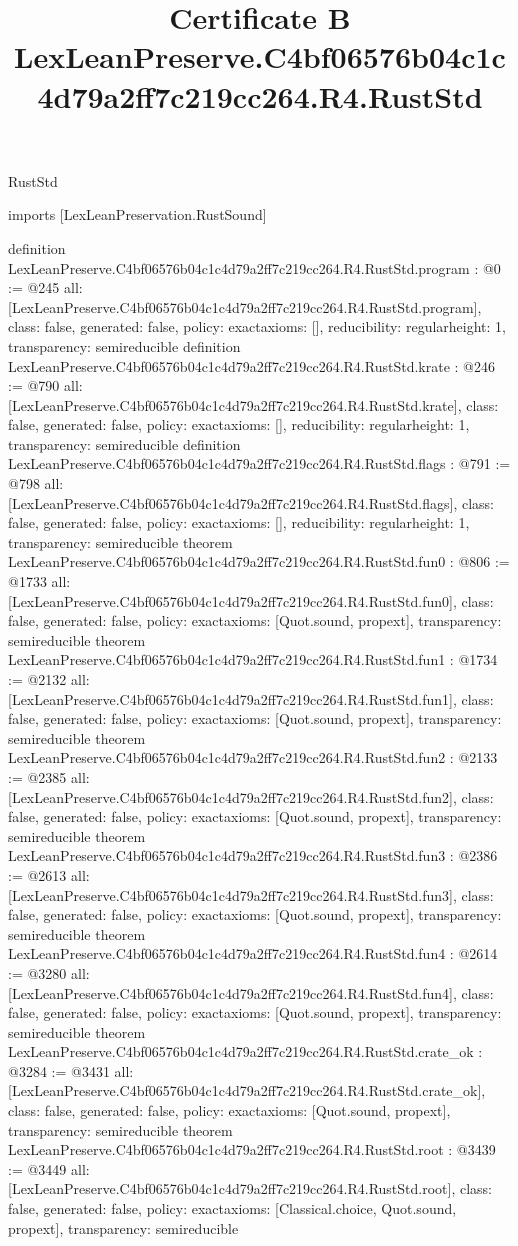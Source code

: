 \begin{lexlean}{RustStd}
\title{Certificate B LexLeanPreserve.C4bf06576b04c1c4d79a2ff7c219cc264.R4.RustStd}
\begin{coremodule}
imports [LexLeanPreservation.RustSound]

definition LexLeanPreserve.C4bf06576b04c1c4d79a2ff7c219cc264.R4.RustStd.program : @0 := @245 {
  all: [LexLeanPreserve.C4bf06576b04c1c4d79a2ff7c219cc264.R4.RustStd.program],
  class: false,
  generated: false,
  policy: exact{axioms: []},
  reducibility: regular{height: 1},
  transparency: semireducible
}
definition LexLeanPreserve.C4bf06576b04c1c4d79a2ff7c219cc264.R4.RustStd.krate : @246 := @790 {
  all: [LexLeanPreserve.C4bf06576b04c1c4d79a2ff7c219cc264.R4.RustStd.krate],
  class: false,
  generated: false,
  policy: exact{axioms: []},
  reducibility: regular{height: 1},
  transparency: semireducible
}
definition LexLeanPreserve.C4bf06576b04c1c4d79a2ff7c219cc264.R4.RustStd.flags : @791 := @798 {
  all: [LexLeanPreserve.C4bf06576b04c1c4d79a2ff7c219cc264.R4.RustStd.flags],
  class: false,
  generated: false,
  policy: exact{axioms: []},
  reducibility: regular{height: 1},
  transparency: semireducible
}
theorem LexLeanPreserve.C4bf06576b04c1c4d79a2ff7c219cc264.R4.RustStd.fun0 : @806 := @1733 {
  all: [LexLeanPreserve.C4bf06576b04c1c4d79a2ff7c219cc264.R4.RustStd.fun0],
  class: false,
  generated: false,
  policy: exact{axioms: [Quot.sound, propext]},
  transparency: semireducible
}
theorem LexLeanPreserve.C4bf06576b04c1c4d79a2ff7c219cc264.R4.RustStd.fun1 : @1734 := @2132 {
  all: [LexLeanPreserve.C4bf06576b04c1c4d79a2ff7c219cc264.R4.RustStd.fun1],
  class: false,
  generated: false,
  policy: exact{axioms: [Quot.sound, propext]},
  transparency: semireducible
}
theorem LexLeanPreserve.C4bf06576b04c1c4d79a2ff7c219cc264.R4.RustStd.fun2 : @2133 := @2385 {
  all: [LexLeanPreserve.C4bf06576b04c1c4d79a2ff7c219cc264.R4.RustStd.fun2],
  class: false,
  generated: false,
  policy: exact{axioms: [Quot.sound, propext]},
  transparency: semireducible
}
theorem LexLeanPreserve.C4bf06576b04c1c4d79a2ff7c219cc264.R4.RustStd.fun3 : @2386 := @2613 {
  all: [LexLeanPreserve.C4bf06576b04c1c4d79a2ff7c219cc264.R4.RustStd.fun3],
  class: false,
  generated: false,
  policy: exact{axioms: [Quot.sound, propext]},
  transparency: semireducible
}
theorem LexLeanPreserve.C4bf06576b04c1c4d79a2ff7c219cc264.R4.RustStd.fun4 : @2614 := @3280 {
  all: [LexLeanPreserve.C4bf06576b04c1c4d79a2ff7c219cc264.R4.RustStd.fun4],
  class: false,
  generated: false,
  policy: exact{axioms: [Quot.sound, propext]},
  transparency: semireducible
}
theorem LexLeanPreserve.C4bf06576b04c1c4d79a2ff7c219cc264.R4.RustStd.crate_ok : @3284 := @3431 {
  all: [LexLeanPreserve.C4bf06576b04c1c4d79a2ff7c219cc264.R4.RustStd.crate_ok],
  class: false,
  generated: false,
  policy: exact{axioms: [Quot.sound, propext]},
  transparency: semireducible
}
theorem LexLeanPreserve.C4bf06576b04c1c4d79a2ff7c219cc264.R4.RustStd.root : @3439 := @3449 {
  all: [LexLeanPreserve.C4bf06576b04c1c4d79a2ff7c219cc264.R4.RustStd.root],
  class: false,
  generated: false,
  policy: exact{axioms: [Classical.choice, Quot.sound, propext]},
  transparency: semireducible
}


\end{coremodule}
\end{lexlean}
